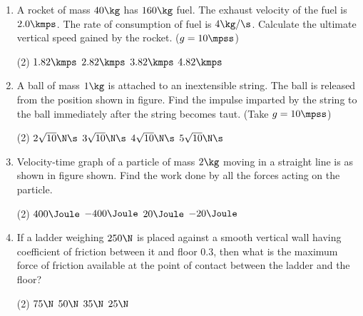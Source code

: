 \documentclass{article}
\begin{document}
\begin{enumerate}
\item A rocket of mass $40 \kg$ has $160 \kg$ fuel. The exhaust velocity of the fuel is $2.0 \kmps$. The rate of consumption of fuel is $4 \kg/\s$. Calculate the ultimate vertical speed gained by the rocket. ($g = 10 \mpss$)
\begin{tasks}(2)
	\task $1.82\kmps$
	\task $2.82\kmps$\ans
	\task $3.82\kmps$
	\task $4.82\kmps$
\end{tasks}

\item A ball of mass $1 \kg$ is attached to an inextensible string. The ball is released from the position shown in figure. Find the impulse imparted by the string to the ball immediately after the string becomes taut. (Take $g = 10 \mpss$)
\begin{center}
\end{center}
\begin{tasks}(2)
	\task $2\sqrt{10}\N\s$\ans
	\task $3\sqrt{10}\N\s$
	\task $4\sqrt{10}\N\s$
	\task $5\sqrt{10}\N\s$
\end{tasks}

\item Velocity-time graph of a particle of mass $2 \kg$ moving in a straight line is as shown in figure shown. Find the work done by all the forces acting on the particle.
\begin{center}
\end{center}
\begin{tasks}(2)
	\task $400\Joule$
	\task $-400\Joule$\ans
	\task $20\Joule$
	\task $-20\Joule$
\end{tasks}

\item If a ladder weighing $250 \N$ is placed against a smooth vertical wall having coefficient of friction between it and floor $0.3$, then what is the maximum force of friction available at the point of contact between the ladder and the floor?
\begin{tasks}(2)
	\task $75\N$
	\task $50\N$
	\task $35\N$
	\task $25\N$\ans
\end{tasks}


\end{enumerate}
\end{document}
